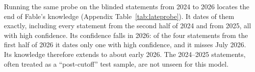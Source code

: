 Running the same probe on the  blinded statements from 2024 to 2026 locates the end of
Fable's knowledge (Appendix Table~\ref{tab:lateprobe}). It dates  of them exactly,
including every statement from the second half of 2024 and from 2025, all with high confidence. Its
confidence falls in 2026: of the four statements from the first half of 2026 it dates only one with high
confidence, and it misses July 2026. Its knowledge therefore extends to about early 2026. The 2024--2025
statements, often treated as a ``post-cutoff'' test sample, are not unseen for this model.
